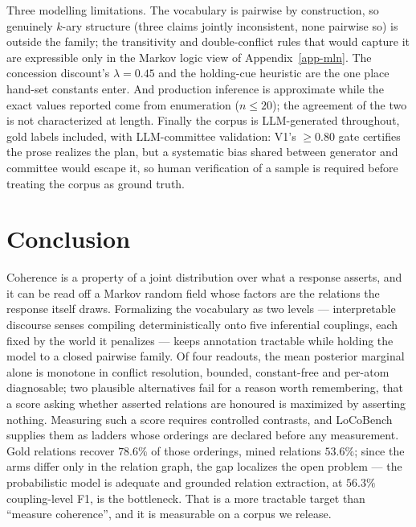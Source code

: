 \documentclass{article} %
\begin{document}
Three modelling limitations. The vocabulary is pairwise by construction, so genuinely $k$-ary
structure (three claims jointly inconsistent, none pairwise so) is outside the family; the
transitivity and double-conflict rules that would capture it are expressible only in the Markov
logic view of Appendix~\ref{app-mln}. The concession discount's $\lambda=0.45$ and the holding-cue
heuristic are the one place hand-set constants enter. And production inference is approximate while
the exact values reported come from enumeration ($n\le20$); the agreement of the two is not
characterized at length. Finally the corpus is LLM-generated throughout, gold labels included, with
LLM-committee validation: V1's $\ge0.80$ gate certifies the prose realizes the plan, but a
systematic bias shared between generator and committee would escape it, so human verification of a
sample is required before treating the corpus as ground truth.

\section{Conclusion}

Coherence is a property of a joint distribution over what a response asserts, and it can be read
off a Markov random field whose factors are the relations the response itself draws. Formalizing
the vocabulary as two levels --- interpretable discourse senses compiling deterministically onto
five inferential couplings, each fixed by the world it penalizes --- keeps annotation tractable
while holding the model to a closed pairwise family. Of four readouts, the mean posterior marginal
alone is monotone in conflict resolution, bounded, constant-free and per-atom diagnosable; two
plausible alternatives fail for a reason worth remembering, that a score asking whether asserted
relations are honoured is maximized by asserting nothing. Measuring such a score requires
controlled contrasts, and LoCoBench supplies them as ladders whose orderings are declared before
any measurement. Gold relations recover $78.6\%$ of those orderings, mined relations $53.6\%$;
since the arms differ only in the relation graph, the gap localizes the open problem --- the
probabilistic model is adequate and grounded relation extraction, at $56.3\%$ coupling-level F1, is
the bottleneck. That is a more tractable target than ``measure coherence'', and it is measurable on
a corpus we release.
\end{document}
